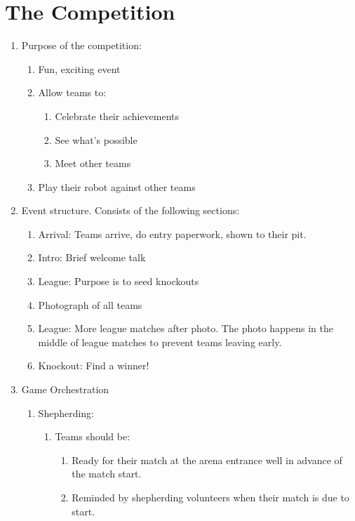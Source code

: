 \section{The Competition}

\begin{enumerate}
\item Purpose of the competition:
  \begin{enumerate}
  \item Fun, exciting event
  \item Allow teams to:
    \begin{enumerate}
    \item Celebrate their achievements
    \item See what's possible
    \item Meet other teams
    \end{enumerate}
  \item Play their robot against other teams
  \end{enumerate}

\item Event structure.  Consists of the following sections:
  \begin{enumerate}
  \item Arrival: Teams arrive, do entry paperwork, shown to their pit.
  \item Intro: Brief welcome talk
  \item League: Purpose is to seed knockouts
  \item Photograph of all teams
  \item League: More league matches after photo. The photo happens in the middle of league matches to prevent teams leaving early.
  \item Knockout: Find a winner!
  \end{enumerate}

\item Game Orchestration
  \begin{enumerate}
  \item Shepherding:
    \begin{enumerate}
    \item Teams should be:
      \begin{enumerate}
      \item Ready for their match at the arena entrance well in advance of the match start.
      \item Reminded by shepherding volunteers when their match is due to start.
      \end{enumerate}


\end{enumerate}
\end{enumerate}
\end{enumerate}
